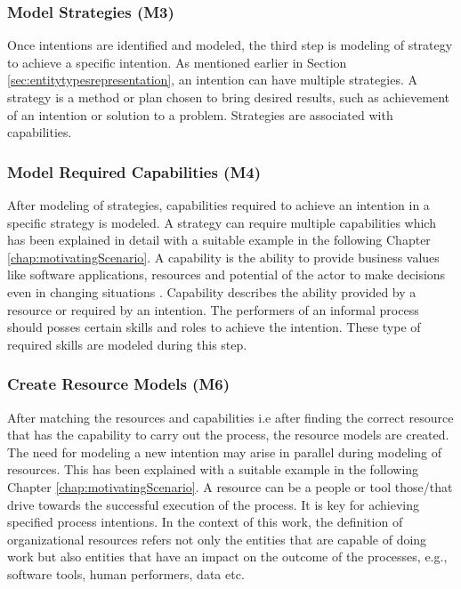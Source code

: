 \subsubsection{Model Strategies (M3)}  
Once intentions are identified and modeled, the third step is modeling of strategy to achieve a specific intention. As mentioned earlier in Section \ref{sec:entitytypesrepresentation}, an intention can have multiple strategies.  A  strategy is a method or plan chosen to bring  desired results, such as achievement of an intention or solution to a problem. Strategies are associated with capabilities. 

\subsubsection{Model Required Capabilities (M4)}  
After modeling of strategies, capabilities required to achieve an intention in a specific strategy is modeled. A strategy can require multiple capabilities which has been explained in detail with a suitable example in the following Chapter \ref{chap:motivatingScenario}. 
A capability is the ability to provide business values like software applications, resources and potential of the actor to make decisions even in changing situations \cite{Stirna2012}. Capability describes the ability provided by a resource or required by an intention. The performers of an informal process should posses certain skills and roles to achieve the intention. These type of required skills are modeled during this step.

\subsubsection{Create Resource Models (M6)}  
After matching the resources and capabilities i.e after finding the correct resource that has the capability to carry out the process, the resource models are created. The need for modeling a new intention may arise in parallel during modeling of resources. This has been explained with a suitable example in the following Chapter \ref{chap:motivatingScenario}.  A resource can be a people or tool those/that drive towards the successful execution of the process. It is key for achieving specified process intentions. In the context of this work, the definition of organizational resources refers not only the entities that are capable of doing work but also entities that have an impact on the outcome of the processes, e.g., software tools, human performers, data etc.      

